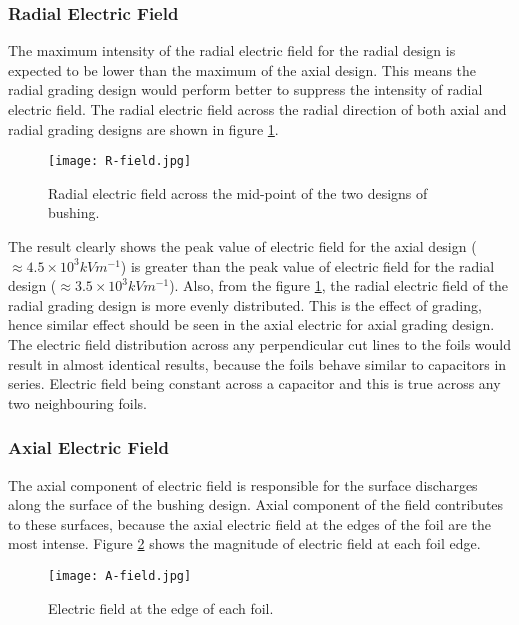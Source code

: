 \subsubsection{Radial Electric Field}
The maximum intensity of the radial electric field for the radial design is expected to be lower than the maximum of the axial design. This means the radial grading design would perform better to suppress the intensity of radial electric field. The radial electric field across the radial direction of both axial and radial grading designs are shown in figure \ref{figure:rfield}.

\begin{figure}[!h]
\centering
\texttt{[image: R-field.jpg]}
\caption{Radial electric field across the mid-point of the two designs of bushing.}
\label{figure:rfield}
\end{figure}

The result clearly shows the peak value of electric field for the axial design ($\approx 4.5 \times 10^3 kVm^{-1}$) is greater than the peak value of electric field for the radial design ($\approx 3.5 \times 10^3 kVm^{-1}$). Also, from the figure \ref{figure:rfield}, the radial electric field of the radial grading design is more evenly distributed. This is the effect of grading, hence similar effect should be seen in the axial electric for axial grading design. The electric field distribution across any perpendicular cut lines to the foils would result in almost identical results, because the foils behave similar to capacitors in series. Electric field being constant across a capacitor and this is true across any two neighbouring foils.

\subsubsection{Axial Electric Field}
The axial component of electric field is responsible for the surface discharges along the surface of the bushing design. Axial component of the field contributes to these surfaces, because the axial electric field at the edges of the foil are the most intense. Figure \ref{figure:afield} shows the magnitude of electric field at each foil edge. 

\begin{figure}[!h]
\centering
\texttt{[image: A-field.jpg]}
\caption{Electric field at the edge of each foil.}
\label{figure:afield}
\end{figure}

